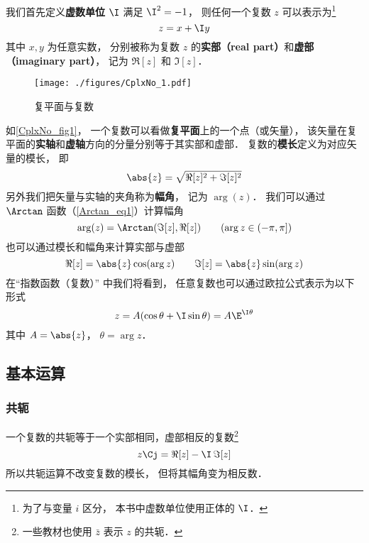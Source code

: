 

我们首先定义\textbf{虚数单位} $\I$ 满足 $\I^2 = -1$， 则任何一个复数 $z$ 可以表示为\footnote{为了与变量 $i$ 区分， 本书中虚数单位使用正体的 $\I$．}
\begin{equation}
z = x + \I y
\end{equation}
其中 $x,y$ 为任意实数， 分别被称为复数 $z$ 的\textbf{实部（real part）}和\textbf{虚部（imaginary part）}， 记为 $\Re[z]$ 和 $\Im[z]$．

\begin{figure}[ht]
\centering
\texttt{[image: ./figures/CplxNo\_1.pdf]}
\caption{复平面与复数} \label{CplxNo_fig1}
\end{figure}

如\autoref{CplxNo_fig1}， 一个复数可以看做\textbf{复平面}上的一个点（或矢量）， 该矢量在复平面的\textbf{实轴}和\textbf{虚轴}方向的分量分别等于其实部和虚部． 复数的\textbf{模长}定义为对应矢量的模长， 即
\begin{equation}
\abs{z} = \sqrt{\Re[z]^2 + \Im[z]^2}
\end{equation}
另外我们把矢量与实轴的夹角称为\textbf{幅角}， 记为 $\arg(z)$． 我们可以通过 $\Arctan$ 函数（\autoref{Arctan_eq1}）计算幅角
\begin{equation}
\arg(z) = \Arctan(\Im[z], \Re[z])
\qquad (\arg z \in (-\pi, \pi])
\end{equation}
也可以通过模长和幅角来计算实部与虚部
\begin{equation}
\Re[z] = \abs{z}\cos(\arg z) \qquad \Im[z] = \abs{z}\sin(\arg z)
\end{equation}
在“指数函数（复数）” 中我们将看到， 任意复数也可以通过欧拉公式表示为以下形式
\begin{equation}
z = A(\cos\theta + \I\sin\theta) = A\E^{\I\theta}
\end{equation}
其中 $A = \abs{z}$， $\theta = \arg z$．

\subsection{基本运算}
\subsubsection{共轭}
一个复数的共轭等于一个实部相同，虚部相反的复数\footnote{一些教材也使用 $\bar z$ 表示 $z$ 的共轭．}
\begin{equation}\label{CplxNo_eq6}
z\Cj = \Re[z] - \I\, \Im[z]
\end{equation}
所以共轭运算不改变复数的模长， 但将其幅角变为相反数．

